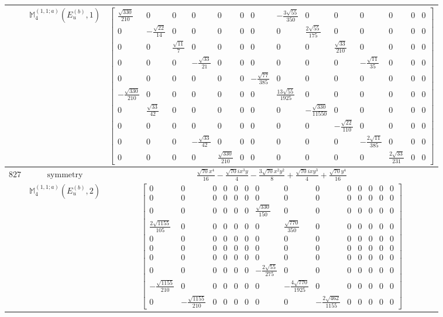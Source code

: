 \documentclass[fleqn,8pt,landscape]{jsarticle}
\begin{document}
\begin{longtable}{ccc}
$  $ & $ \mathbb{M}_{4}^{(1,1;a)}(E_{u}^{(b)},1) $ & $ \begin{bmatrix} \frac{\sqrt{330}}{210} & 0 & 0 & 0 & 0 & 0 & 0 & - \frac{3 \sqrt{55}}{350} & 0 & 0 & 0 & 0 & 0 & 0 \\ 0 & - \frac{\sqrt{22}}{14} & 0 & 0 & 0 & 0 & 0 & 0 & \frac{2 \sqrt{55}}{175} & 0 & 0 & 0 & 0 & 0 \\ 0 & 0 & \frac{\sqrt{11}}{7} & 0 & 0 & 0 & 0 & 0 & 0 & \frac{\sqrt{33}}{210} & 0 & 0 & 0 & 0 \\ 0 & 0 & 0 & - \frac{\sqrt{33}}{21} & 0 & 0 & 0 & 0 & 0 & 0 & - \frac{\sqrt{11}}{35} & 0 & 0 & 0 \\ 0 & 0 & 0 & 0 & 0 & 0 & - \frac{\sqrt{77}}{385} & 0 & 0 & 0 & 0 & 0 & 0 & 0 \\ - \frac{\sqrt{330}}{210} & 0 & 0 & 0 & 0 & 0 & 0 & \frac{13 \sqrt{55}}{1925} & 0 & 0 & 0 & 0 & 0 & 0 \\ 0 & \frac{\sqrt{33}}{42} & 0 & 0 & 0 & 0 & 0 & 0 & - \frac{\sqrt{330}}{11550} & 0 & 0 & 0 & 0 & 0 \\ 0 & 0 & 0 & 0 & 0 & 0 & 0 & 0 & 0 & - \frac{\sqrt{22}}{110} & 0 & 0 & 0 & 0 \\ 0 & 0 & 0 & - \frac{\sqrt{33}}{42} & 0 & 0 & 0 & 0 & 0 & 0 & - \frac{2 \sqrt{11}}{385} & 0 & 0 & 0 \\ 0 & 0 & 0 & 0 & \frac{\sqrt{330}}{210} & 0 & 0 & 0 & 0 & 0 & 0 & \frac{2 \sqrt{33}}{231} & 0 & 0 \end{bmatrix} $ \\ \hline
$ 827 $ & $ \text{symmetry} $ & $ \frac{\sqrt{70} x^{4}}{16} - \frac{\sqrt{70} i x^{3} y}{4} - \frac{3 \sqrt{70} x^{2} y^{2}}{8} + \frac{\sqrt{70} i x y^{3}}{4} + \frac{\sqrt{70} y^{4}}{16} $ \\
$  $ & $ \mathbb{M}_{4}^{(1,1;a)}(E_{u}^{(b)},2) $ & $ \begin{bmatrix} 0 & 0 & 0 & 0 & 0 & 0 & 0 & 0 & 0 & 0 & 0 & 0 & 0 & 0 \\ 0 & 0 & 0 & 0 & 0 & 0 & 0 & 0 & 0 & 0 & 0 & 0 & 0 & 0 \\ 0 & 0 & 0 & 0 & 0 & 0 & \frac{\sqrt{330}}{150} & 0 & 0 & 0 & 0 & 0 & 0 & 0 \\ \frac{2 \sqrt{1155}}{105} & 0 & 0 & 0 & 0 & 0 & 0 & \frac{\sqrt{770}}{350} & 0 & 0 & 0 & 0 & 0 & 0 \\ 0 & 0 & 0 & 0 & 0 & 0 & 0 & 0 & 0 & 0 & 0 & 0 & 0 & 0 \\ 0 & 0 & 0 & 0 & 0 & 0 & 0 & 0 & 0 & 0 & 0 & 0 & 0 & 0 \\ 0 & 0 & 0 & 0 & 0 & 0 & 0 & 0 & 0 & 0 & 0 & 0 & 0 & 0 \\ 0 & 0 & 0 & 0 & 0 & 0 & - \frac{2 \sqrt{55}}{275} & 0 & 0 & 0 & 0 & 0 & 0 & 0 \\ - \frac{\sqrt{1155}}{210} & 0 & 0 & 0 & 0 & 0 & 0 & - \frac{4 \sqrt{770}}{1925} & 0 & 0 & 0 & 0 & 0 & 0 \\ 0 & - \frac{\sqrt{1155}}{210} & 0 & 0 & 0 & 0 & 0 & 0 & - \frac{2 \sqrt{462}}{1155} & 0 & 0 & 0 & 0 & 0 \end{bmatrix} $ \\ \hline

\end{longtable}
\end{document}
